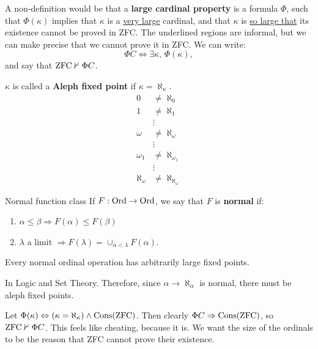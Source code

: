 \documentclass{article}
\begin{document}
A non-definition would be that a \textbf{large cardinal property} is a formula $\Phi$, such that $\Phi(\kappa)$ implies that $\kappa$ is a \underline{very large} cardinal, and that $\kappa$ is \underline{so large that} its existence cannot be proved in ZFC.\gap
The underlined regions are informal, but we can make precise that we cannot prove it in ZFC. We can write: \[ \Phi C \Leftrightarrow \exists \kappa, \, \Phi(\kappa),\] and say that $\operatorname{ZFC} \nvdash \Phi C$.
\begin{nonex}
    $\kappa$ is called a \textbf{Aleph fixed point} if $\kappa = \aleph_{\kappa}$. 
    \begin{align*}
        0 &\neq \aleph_{0}\\
        1 &\neq \aleph_{1}\\
        &\vdots\\
        \omega &\neq \aleph_{\omega}\\
        &\vdots\\
        \omega_{1} &\neq \aleph_{\omega_{1}}\\
        &\vdots\\
        \aleph_{\omega} &\neq \aleph_{\aleph_{\omega}}
    \end{align*}
\end{nonex}
\begin{fancydefine}{Normal function class}
    If $F: \operatorname{Ord} \to \operatorname{Ord}$, we say that $F$ is \textbf{normal} if: \begin{enumerate}
        \item[(a)] $\alpha \leq \beta \Rightarrow F(\alpha) \leq F(\beta)$
        \item[(b)] $\lambda$ a limit $\Rightarrow F(\lambda) = \cup_{\alpha < \lambda} F(\alpha)$.  
    \end{enumerate}
\end{fancydefine}
\begin{fancyprop}{}
    Every normal ordinal operation has arbitrarily large fixed points.
\end{fancyprop}
\proof In Logic and Set Theory. \endproof
Therefore, since $\alpha \to \aleph_{\alpha}$ is normal, there must be aleph fixed points.
\begin{nonex}
    Let $\Phi(\kappa) \Leftrightarrow (\kappa = \aleph_{\kappa}) \wedge \operatorname{Cons}(\operatorname{ZFC})$.\gap 
    Then clearly $\Phi C \Rightarrow \operatorname{Cons}(\operatorname{ZFC})$, so $\operatorname{ZFC} \nvdash \Phi C$. This feels like cheating, because it is. We want the size of the ordinals to be the reason that ZFC cannot prove their existence.
\end{nonex}
\end{document}
